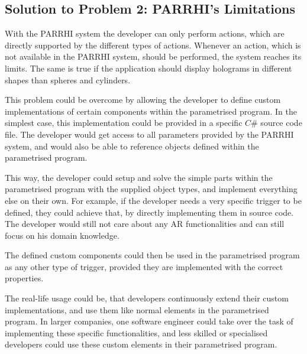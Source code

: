 \subsection{Solution to Problem 2: PARRHI's Limitations}

With the PARRHI system the developer can only perform actions, which are directly supported by the different types of actions. Whenever an action, which is not available in the PARRHI system, should be performed, the system reaches its limits. The same is true if the application should display holograms in different shapes than spheres and cylinders.

This problem could be overcome by allowing the developer to define custom implementations of certain components within the parametrised program. In the simplest case, this implementation could be provided in a specific $C\#$ source code file. The developer would get access to all parameters provided by the PARRHI system, and would also be able to reference objects defined within the parametrised program.

This way, the developer could setup and solve the simple parts within the parametrised program with the supplied object types, and implement everything else on their own. For example, if the developer needs a very specific trigger to be defined, they could achieve that, by directly implementing them in source code. The developer would still not care about any AR functionalities and can still focus on his domain knowledge. 

The defined custom components could then be used in the parametrised program as any other type of trigger, provided they are implemented with the correct properties. 

The real-life usage could be, that developers continuously extend their custom implementations, and use them like normal elements in the parametrised program. In larger companies, one software engineer could take over the task of implementing these specific functionalities, and less skilled or specialised developers could use these custom elements in their parametrised program.

 
 
 
 
 
 
 
 
 
 
 
 
 
 
 
 
 
 